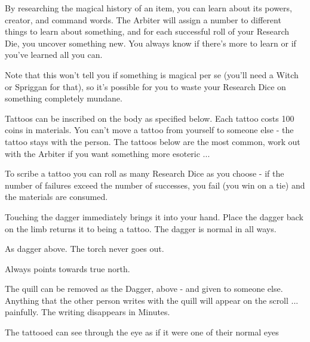 {

By researching the magical history of an item, you can learn about its powers, creator, and command words.  The Arbiter will assign a number to different things to learn about something, and for each successful roll of your Research Die, you uncover something new. You always know if there's more to learn or if you've learned all you can.

Note that this won't tell you if something is magical per se (you'll need a Witch or Spriggan for that), so it's possible for you to waste your Research Dice on something completely mundane.



Tattoos can be inscribed on the body as specified below.  Each tattoo costs 100 coins in materials. You can't move a tattoo from yourself to someone else - the tattoo stays with the person.  The tattoos below are the most common, work out with the Arbiter if you want something more esoteric ...

To scribe a tattoo you can roll as many Research Dice as you choose - if the number of failures exceed the number of successes, you fail (you win on a tie) and the materials are consumed.




Touching the dagger immediately brings it into your hand.  Place the dagger back on the limb returns it to being a tattoo.  The dagger is normal in all ways.



As dagger above.  The torch never goes out.


Always points towards true north.  


The quill can be removed as the Dagger, above - and given to someone else.  Anything that the other person writes with the quill will appear on the scroll ... painfully.  The writing disappears in Minutes.


The tattooed can see through the eye as if it were one of their normal eyes

}
